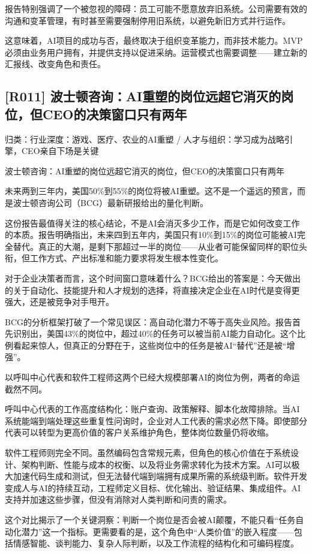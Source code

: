 \documentclass[11pt]{ctexart}
\begin{document}
报告特别强调了一个被忽视的障碍：员工可能不愿意放弃旧系统。公司需要有效的沟通和变革管理，有时甚至需要强制停用旧系统，以避免新旧方式并行运作。

这意味着，AI项目的成功与否，最终取决于组织变革能力，而非技术能力。MVP必须由业务用户拥有，并提供支持以促进采纳。运营模式也需要调整——建立新的汇报线、改变角色和责任。

\subsection{[R011] 波士顿咨询：AI重塑的岗位远超它消灭的岗位，但CEO的决策窗口只有两年}
{\small\color{refgray}归类：行业深度：游戏、医疗、农业的AI重塑 / 人才与组织：学习成为战略引擎，CEO亲自下场是关键}

波士顿咨询：AI重塑的岗位远超它消灭的岗位，但CEO的决策窗口只有两年

未来两到三年内，美国50\%到55\%的岗位将被AI重塑。这不是一个遥远的预言，而是波士顿咨询公司（BCG）最新研报给出的量化判断。

这份报告最值得关注的核心结论，不是AI会消灭多少工作，而是它如何改变工作的本质。报告明确指出，未来四到五年内，美国只有10\%到15\%的岗位可能被AI完全替代。真正的大潮，是剩下那超过一半的岗位——从业者可能保留同样的职位头衔，但工作方式、产出标准和能力要求将发生根本性变化。

对于企业决策者而言，这个时间窗口意味着什么？BCG给出的答案是：今天做出的关于自动化、技能提升和人才规划的选择，将直接决定企业在AI时代是变得更强大，还是被竞争对手甩开。

BCG的分析框架打破了一个常见误区：高自动化潜力不等于高失业风险。报告首先识别出，美国43\%的岗位中，超过40\%的任务可以被当前AI能力自动化。这个比例看起来惊人，但真正的分野在于，这些岗位中的任务是被AI“替代”还是被“增强”。

以呼叫中心代表和软件工程师这两个已经大规模部署AI的岗位为例，两者的命运截然不同。

呼叫中心代表的工作高度结构化：账户查询、政策解释、脚本化故障排除。当AI系统能端到端处理这些重复性问询时，企业对人工代表的需求必然下降。即使部分代表可以转型为更高价值的客户关系维护角色，整体岗位数量仍将收缩。

软件工程师则完全不同。虽然编码包含常规元素，但角色的核心价值在于系统设计、架构判断、性能与成本的权衡、以及将业务需求转化为技术方案。AI可以极大加速代码生成和测试，但无法替代端到端拥有成果所需的系统级判断。软件开发变成人与AI的持续互动，工程师定义目标、优化输出、验证结果、集成组件。AI支持并加速这些步骤，但没有消除对人类判断和问责的需求。

这个对比揭示了一个关键洞察：判断一个岗位是否会被AI颠覆，不能只看“任务自动化潜力”这一个指标。更需要看的是，这个角色中“人类价值”的嵌入程度——包括情感智能、谈判能力、复杂人际判断，以及工作流程的结构化和可编码程度。
\end{document}
